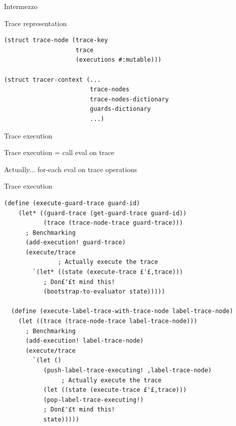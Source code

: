 \documentclass{beamer}
\begin{document}
\begin{frame}[fragile]{Intermezzo}

Trace representation

\begin{lstlisting}[basicstyle = \scriptsize\ttfamily, escapechar = £]
(struct trace-node (trace-key
                    trace
                    (executions #:mutable)))
                    
(struct tracer-context (...
                        trace-nodes
                        trace-nodes-dictionary
                        guards-dictionary
                        ...)
\end{lstlisting}

\end{frame}

\begin{frame}[fragile]{Trace execution}

\centering
Trace execution = call eval on trace

\pause

\vspace{2cm}

Actually... for-each eval on trace operations

\end{frame}

\begin{frame}[fragile]{Trace execution}

\begin{lstlisting}[basicstyle = \tiny\ttfamily, escapechar = £]
(define (execute-guard-trace guard-id)
    (let* ((guard-trace (get-guard-trace guard-id))
           (trace (trace-node-trace guard-trace)))
      ; Benchmarking
      (add-execution! guard-trace)
      (execute/trace
               ; Actually execute the trace
        `(let* ((state (execute-trace £'£,trace))) 
           ; Don£'£t mind this!
           (bootstrap-to-evaluator state)))))
  
  (define (execute-label-trace-with-trace-node label-trace-node)
    (let ((trace (trace-node-trace label-trace-node)))
      ; Benchmarking
      (add-execution! label-trace-node)
      (execute/trace
        `(let ()
           (push-label-trace-executing! ,label-trace-node)
                ; Actually execute the trace
           (let ((state (execute-trace £'£,trace))) 
           (pop-label-trace-executing!)
           ; Don£'£t mind this!
           state)))))
\end{lstlisting}
\end{frame}
  
\end{document}
